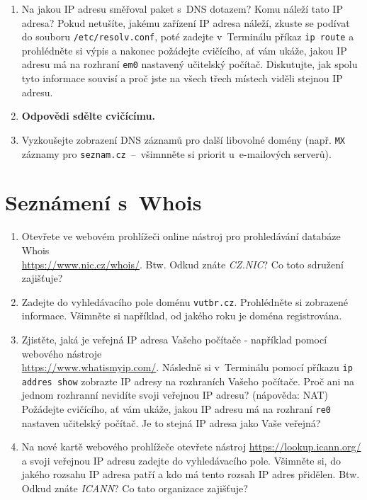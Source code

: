 \begin{enumerate}
    \item Na jakou IP adresu směřoval paket s~DNS dotazem? Komu náleží tato IP adresa? Pokud netušíte, jakému zařízení IP adresa náleží, zkuste se podívat do souboru \texttt{/etc/resolv.conf}, poté zadejte v~Terminálu příkaz \texttt{ip route} a prohlédněte si výpis a nakonec požádejte cvičícího, ať vám ukáže, jakou IP adresu má na rozhraní \texttt{em0} nastavený učitelský počítač. Diskutujte, jak spolu tyto informace souvisí a proč jste na všech třech místech viděli stejnou IP adresu.
    \item \textbf{Odpovědi sdělte cvičícímu.}
    \item Vyzkoušejte zobrazení DNS záznamů pro další libovolné domény (např. \texttt{MX} záznamy pro \texttt{seznam.cz}~--~všimnněte si priorit u~e-mailových serverů).
\end{enumerate}

\section{Seznámení s~Whois}
\begin{enumerate}
    \item Otevřete ve webovém prohlížeči online nástroj pro prohledávání databáze Whois\\ \url{https://www.nic.cz/whois/}. Btw. Odkud znáte \emph{CZ.NIC}? Co toto sdružení zajišťuje?
    \item Zadejte do vyhledávacího pole doménu \texttt{vutbr.cz}. Prohlédněte si zobrazené informace. Všimněte si například, od jakého roku je doména registrována.
    \item Zjistěte, jaká je veřejná IP adresa Vašeho počítače - například pomocí webového nástroje\\ \url{https://www.whatismyip.com/}. Následně si v~Terminálu pomocí příkazu \texttt{ip addres show} zobrazte IP adresy na rozhraních Vašeho počítače. Proč ani na jednom rozhranní nevidíte svoji veřejnou IP adresu? (nápověda: NAT) Požádejte cvičícího, ať vám ukáže, jakou IP adresu má na rozhraní \texttt{re0} nastaven učitelský počítač. Je to stejná IP adresa jako Vaše veřejná?
    \item Na nové kartě webového prohlížeče otevřete nástroj \url{https://lookup.icann.org/} a svoji veřejnou IP adresu zadejte do vyhledávacího pole. Všimněte si, do jakého rozsahu IP adresa patří a kdo má tento rozsah IP adres přidělen. Btw. Odkud znáte \emph{ICANN}? Co tato organizace zajišťuje?
\end{enumerate}


